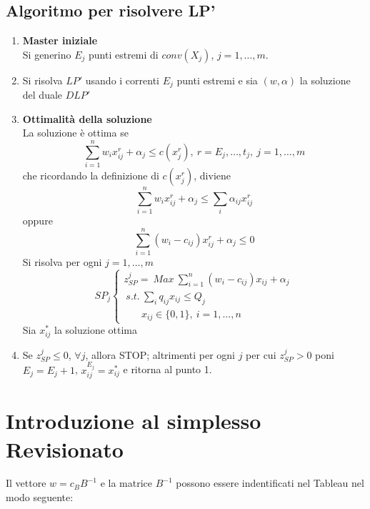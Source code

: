 \subsection{Algoritmo per risolvere LP'}
\begin{enumerate}
	\item \textbf{Master iniziale}\\
	Si generino $E_{j}$ punti estremi di $conv(X_{j})$, $j=1,\dots,m$.
	\item Si risolva $LP'$ usando i correnti $E_{j}$ punti estremi e sia $(w,\alpha)$ la soluzione del duale $DLP'$
	\item \textbf{Ottimalità della soluzione}\\
	La soluzione è ottima se
	\begin{equation*}
		\sum_{i=1}^{n}w_{i}x_{ij}^{r}+\alpha_{j}\le c(x_{j}^{r}),\ r=E_{j},\dots,t_{j},\ j=1,\dots,m
	\end{equation*}
	che ricordando la definizione di $c(x_{j}^{r})$, diviene
	\begin{equation*}
		\sum_{i=1}^{n}w_{i}x_{ij}^{r}+\alpha_{j}\le \sum_{i}\alpha_{ij}x_{ij}^{r}
	\end{equation*}
	oppure
	\begin{equation*}
		\sum_{i=1}^{n}(w_{i}-c_{ij})x_{ij}^{r}+\alpha_{j}\le 0
	\end{equation*}
	Si risolva per ogni $j=1,\dots,m$
	\begin{equation*}
		SP_{j}
		\begin{cases}
			z_{SP}^{j}=\ Max\ \sum_{i=1}^{n}(w_{i}-c_{ij})x_{ij}+\alpha_{j} \\
			\ s.t.\ \sum_{i}q_{ij}x_{ij}\le Q_{j} \\
			\ \ \ \ \ \ \ \ x_{ij}\in\{0,1\},\ i=1,\dots,n
		\end{cases}
	\end{equation*}
	Sia $x_{ij}^{*}$ la soluzione ottima
	\item Se $z_{SP}^{j}\le 0$, $\forall j$, allora STOP; altrimenti per ogni $j$ per cui $z_{SP}^{j}>0$ poni $E_{j}=E_{j}+1$, $x_{ij}^{E_{j}}=x_{ij}^{*}$ e ritorna al punto 1.
\end{enumerate}

\section{Introduzione al simplesso Revisionato}
Il vettore $w=c_{B}B^{-1}$ e la matrice $B^{-1}$ possono essere indentificati nel Tableau nel modo seguente:

